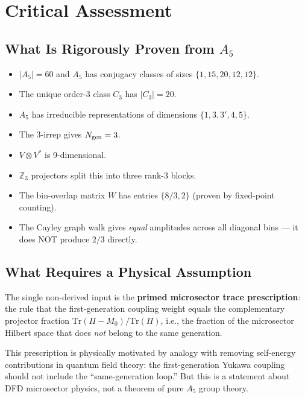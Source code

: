 \documentclass[11pt]{article}
\theoremstyle{definition}
\begin{document}
\section{Critical Assessment}

\subsection{What Is Rigorously Proven from $A_5$}

\begin{itemize}
\item $|A_5| = 60$ and $A_5$ has conjugacy classes of sizes $\{1, 15, 20, 12, 12\}$.
\item The unique order-3 class $C_3$ has $|C_3| = 20$.
\item $A_5$ has irreducible representations of dimensions $\{1, 3, 3', 4, 5\}$.
\item The 3-irrep gives $N_{\rm gen} = 3$.
\item $V \otimes V^*$ is 9-dimensional.
\item $\mathbb{Z}_3$ projectors split this into three rank-3 blocks.
\item The bin-overlap matrix $W$ has entries $\{8/3, 2\}$ (proven by fixed-point counting).
\item The Cayley graph walk gives \emph{equal} amplitudes across all diagonal bins --- it does NOT produce $2/3$ directly.
\end{itemize}

\subsection{What Requires a Physical Assumption}

The single non-derived input is the \textbf{primed microsector trace prescription}: the rule that
the first-generation coupling weight equals the complementary projector fraction
$\mathrm{Tr}(\Pi - M_0)/\mathrm{Tr}(\Pi)$, i.e., the fraction of the microsector Hilbert space
that does \emph{not} belong to the same generation.

This prescription is physically motivated by analogy with removing self-energy contributions
in quantum field theory: the first-generation Yukawa coupling should not include the
``same-generation loop.'' But this is a statement about DFD microsector physics, not a
theorem of pure $A_5$ group theory.
\end{document}
